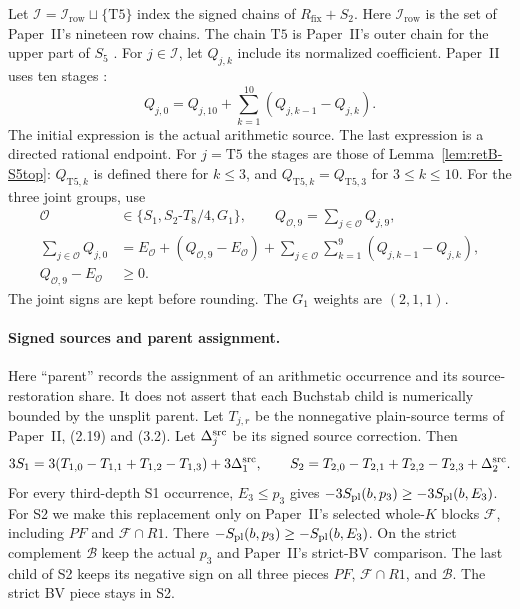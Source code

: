 Let $\mathcal I=\mathcal I_{\mathrm{row}}\sqcup\{\mathrm{T5}\}$ index the
signed chains of $R_{\mathrm{fix}}+S_2$. Here $\mathcal I_{\mathrm{row}}$ is the
set of Paper~II's nineteen row chains. The chain $\mathrm{T5}$ is Paper~II's outer
chain for the upper part of $S_5$
\cite[(2.28), (5.10), (6.1) and \S6.1, condition~1]{PaperII}.
For $j\in\mathcal I$, let $Q_{j,k}$ include its normalized coefficient.
Paper~II uses ten stages
\cite[(6.4)--(6.4d)]{PaperII}:
\begin{equation}\label{eq:retB-telescope}
 Q_{j,0}=Q_{j,10}
       +\sum_{k=1}^{10}(Q_{j,k-1}-Q_{j,k}).
\end{equation}
The initial expression is the actual arithmetic source.
The last expression is a directed rational endpoint.
For $j=\mathrm{T5}$ the stages are those of Lemma~\ref{lem:retB-S5top}:
$Q_{\mathrm{T5},k}$ is defined there for $k\le3$, and
$Q_{\mathrm{T5},k}=Q_{\mathrm{T5},3}$ for $3\le k\le10$.
For the three joint groups, use
\begin{equation}\label{eq:retB-joint}
\begin{aligned}
 \mathcal O&\in\{S_1,S_2\text{-}T_8/4,G_1\},\qquad
 Q_{\mathcal O,9}=\sum_{j\in\mathcal O}Q_{j,9},\\
 \sum_{j\in\mathcal O}Q_{j,0}
 &=E_{\mathcal O}+(Q_{\mathcal O,9}-E_{\mathcal O})
    +\sum_{j\in\mathcal O}\sum_{k=1}^{9}
             (Q_{j,k-1}-Q_{j,k}),\\
 Q_{\mathcal O,9}-E_{\mathcal O}&\ge0.
\end{aligned}
\end{equation}
The joint signs are kept before rounding.
The $G_1$ weights are $(2,1,1)$.

\paragraph{Signed sources and parent assignment.}
Here ``parent'' records the assignment of an arithmetic occurrence and its
source-restoration share. It does not assert that each Buchstab child
is numerically bounded by the unsplit parent. Let $T_{j,r}$ be the
nonnegative plain-source terms of Paper~II, (2.19) and (3.2). Let
$\Delta_j^{\rm src}$ be its signed source correction. Then
\[
 3S_1=3(T_{1,0}-T_{1,1}+T_{1,2}-T_{1,3})
                  +3\Delta_1^{\rm src},\qquad
 S_2=T_{2,0}-T_{2,1}+T_{2,2}-T_{2,3}+\Delta_2^{\rm src}.
\]
For every third-depth S1 occurrence, $E_3\le p_3$ gives
$-3S_{\rm pl}(b,p_3)\ge-3S_{\rm pl}(b,E_3)$. For S2 we make this
replacement only on Paper~II's selected whole-$K$ blocks $\mathcal F$,
including $PF$ and $\mathcal F\cap R1$. There
$-S_{\rm pl}(b,p_3)\ge-S_{\rm pl}(b,E_3)$. On the strict complement
$\mathcal B$ keep the actual $p_3$ and Paper~II's strict-BV comparison.
The last child of S2 keeps its negative sign on all three pieces
$PF$, $\mathcal F\cap R1$, and $\mathcal B$. The strict BV piece stays in S2.

